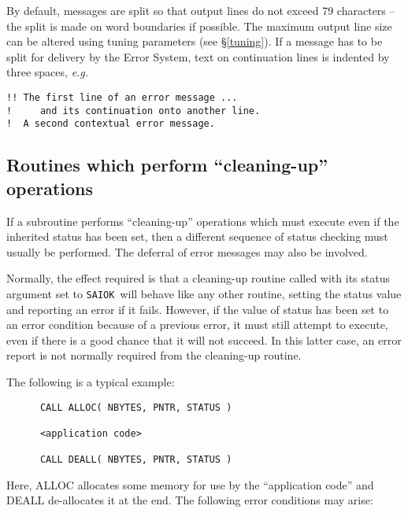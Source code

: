 \documentclass[twoside,11pt]{article}
\newcommand{\htmlref}[2]{#1}
\newcommand{\latex}[1]{#1}
\newcommand{\xlabel}[1]{}
\renewcommand{\_}{\texttt{\symbol{95}}}
\newcommand{\const}[1]{\texttt{#1}}
\newcommand{\saiok}{\const{SAI\_\_OK}}
\begin{document}
By default, messages are split so that output lines do not exceed 
79 characters -- the split is made on word boundaries if possible. 
The maximum output line size can be altered using
\htmlref{tuning parameters}{tuning}\latex{ (see \S\ref{tuning})}.
If a message has to be split for delivery by the Error System, text on 
continuation lines is indented by three spaces, \textit{e.g.}
\begin {small}
\begin{verbatim}
!! The first line of an error message ...
!     and its continuation onto another line.
!  A second contextual error message.
\end{verbatim}
\end {small}

\subsection{\xlabel{routines_which_perform_cleaningup_operations}Routines which perform ``cleaning-up'' operations}

If a subroutine performs ``cleaning-up'' operations which must execute even
if the inherited status has been set, then a different sequence of status 
checking must usually be performed.
The deferral of error messages may also be involved.

Normally, the effect required is that a cleaning-up routine called with 
its status argument set to \saiok\ will behave like any other routine, 
setting the status value and reporting an error if it fails.
However, if the value of status has been set to an error condition because of 
a previous error, it must still attempt to execute, even if there is a
good chance that it will not succeed.
In this latter case, an error report is not normally required from the
cleaning-up routine. 

The following is a typical example:

\begin {small}
\begin{verbatim}
      CALL ALLOC( NBYTES, PNTR, STATUS )

      <application code>

      CALL DEALL( NBYTES, PNTR, STATUS )
\end{verbatim}
\end {small}

Here, ALLOC allocates some memory for use by the ``application code'' and 
DEALL de-allocates it at the end.
The following error conditions may arise:
\end{document}
